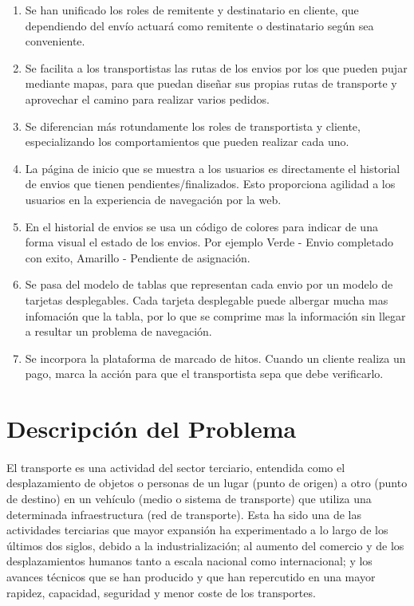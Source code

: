 \documentclass[10pt, a4paper,spanish]{article}
\begin{document}
			\begin{enumerate}
				\item Se han unificado los roles de remitente y destinatario en cliente, que dependiendo del envío actuará como remitente o destinatario según sea conveniente.

				\item Se facilita a los transportistas las rutas de los envios por los que pueden pujar mediante mapas, para que puedan diseñar sus propias rutas de transporte y aprovechar el camino para realizar varios pedidos.

				\item Se diferencian más rotundamente los roles de transportista y cliente, especializando los comportamientos que pueden realizar cada uno.

				\item La página de inicio que se muestra a los usuarios es directamente el historial de envios que tienen pendientes/finalizados. Esto proporciona agilidad a los usuarios en la experiencia de navegación por la web.

				\item En el historial de envios se usa un código de colores para indicar de una forma visual el estado de los envios. Por ejemplo Verde - Envio completado con exito, Amarillo - Pendiente de asignación.

				\item Se pasa del modelo de tablas que representan cada envio por un modelo de tarjetas desplegables. Cada tarjeta desplegable puede albergar mucha mas infomación que la tabla, por lo que se comprime mas la información sin llegar a resultar un problema de navegación.

				\item Se incorpora la plataforma de marcado de hitos. Cuando un cliente realiza un pago, marca la acción para que el transportista sepa que debe verificarlo.
			\end{enumerate}



	\section{Descripción del Problema}

		\paragraph{}
		El transporte es una actividad del sector terciario, entendida como el desplazamiento de objetos o personas de un lugar (punto de origen) a otro (punto de destino) en un vehículo (medio o sistema de transporte) que utiliza una determinada infraestructura (red de transporte). Esta ha sido una de las actividades terciarias que mayor expansión ha experimentado a lo largo de los últimos dos siglos, debido a la industrialización; al aumento del comercio y de los desplazamientos humanos tanto a escala nacional como internacional; y los avances técnicos que se han producido y que han repercutido en una mayor rapidez, capacidad, seguridad y menor coste de los transportes. \cite{wikipedia_transporte}
\end{document}
